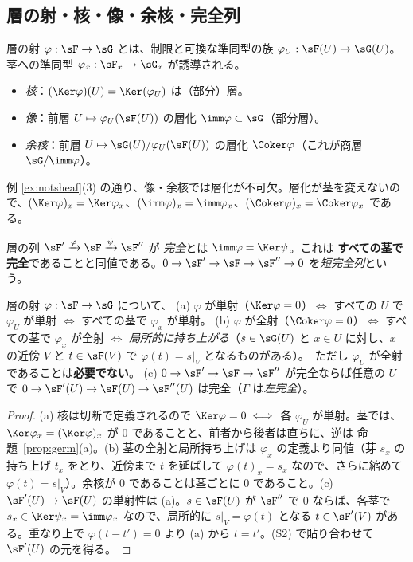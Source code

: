 \subsection{層の射・核・像・余核・完全列}
層の射 $\varphi:\sF\to\sG$ とは、制限と可換な準同型の族 $\varphi_U:\sF(U)\to\sG(U)$。茎への準同型 $\varphi_x:\sF_x\to\sG_x$ が誘導される。
\begin{itemize}
\item \emph{核}：$(\Ker\varphi)(U)=\Ker(\varphi_U)$ は（部分）層。
\item \emph{像}：前層 $U\mapsto\varphi_U(\sF(U))$ の層化 $\imm\varphi\subset\sG$（部分層）。
\item \emph{余核}：前層 $U\mapsto\sG(U)/\varphi_U(\sF(U))$ の層化 $\Coker\varphi$（これが商層 $\sG/\imm\varphi$）。
\end{itemize}
例 \ref{ex:notsheaf}(3) の通り、像・余核では層化が不可欠。層化が茎を変えないので、$(\Ker\varphi)_x=\Ker\varphi_x$、$(\imm\varphi)_x=\imm\varphi_x$、$(\Coker\varphi)_x=\Coker\varphi_x$ である。
\begin{defn}
層の列 $\sF'\xrightarrow{\varphi}\sF\xrightarrow{\psi}\sF''$ が \emph{完全}とは $\imm\varphi=\Ker\psi$。これは \textbf{すべての茎で完全}であることと同値である。$0\to\sF'\to\sF\to\sF''\to0$ を\emph{短完全列}という。
\end{defn}
\begin{prop}\label{prop:exact}\tP
層の射 $\varphi:\sF\to\sG$ について、
(a) $\varphi$ が単射（$\Ker\varphi=0$）$\iff$ すべての $U$ で $\varphi_U$ が単射 $\iff$ すべての茎で $\varphi_x$ が単射。
(b) $\varphi$ が全射（$\Coker\varphi=0$）$\iff$ すべての茎で $\varphi_x$ が全射 $\iff$ \emph{局所的に持ち上がる}（$s\in\sG(U)$ と $x\in U$ に対し、$x$ の近傍 $V$ と $t\in\sF(V)$ で $\varphi(t)=s|_V$ となるものがある）。\ ただし $\varphi_U$ が全射であることは\textbf{必要でない}。
(c) $0\to\sF'\to\sF\to\sF''$ が完全ならば任意の $U$ で $0\to\sF'(U)\to\sF(U)\to\sF''(U)$ は完全（$\Gamma$ は\emph{左完全}）。
\end{prop}
\begin{proof}
(a) 核は切断で定義されるので $\Ker\varphi=0\iff$ 各 $\varphi_U$ が単射。茎では、$\Ker\varphi_x=(\Ker\varphi)_x$ が $0$ であることと、前者から後者は直ちに、逆は 命題~\ref{prop:germ}(a)。(b) 茎の全射と局所持ち上げは $\varphi_x$ の定義より同値（芽 $s_x$ の持ち上げ $t_x$ をとり、近傍まで $t$ を延ばして $\varphi(t)_x=s_x$ なので、さらに縮めて $\varphi(t)=s|_V$）。余核が $0$ であることは茎ごとに $0$ であること。(c) $\sF'(U)\to\sF(U)$ の単射性は (a)。$s\in\sF(U)$ が $\sF''$ で $0$ ならば、各茎で $s_x\in\Ker\psi_x=\imm\varphi_x$ なので、局所的に $s|_{V}=\varphi(t)$ となる $t\in\sF'(V)$ がある。重なり上で $\varphi(t-t')=0$ より (a) から $t=t'$。(S2) で貼り合わせて $\sF'(U)$ の元を得る。\qedhere
\end{proof}
